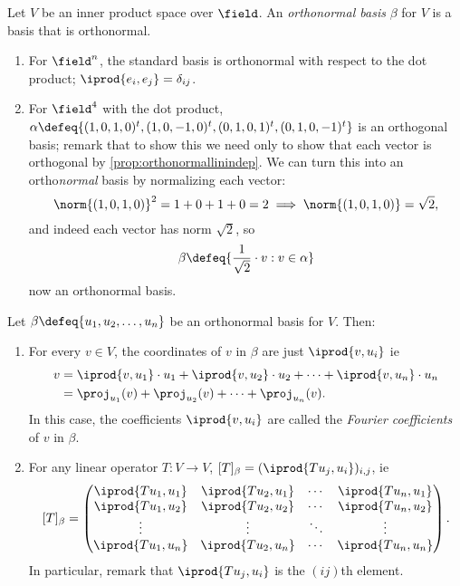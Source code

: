 \begin{definition}
    Let $V$ be an inner product space over $\field$. An \emph{orthonormal basis} $\beta$ for $V$ is a basis that is orthonormal.
\end{definition}

\begin{example}
\begin{enumerate}[label=(\alph*)]
    \item For $\field^n$, the standard basis is orthonormal with respect to the dot product; $\iprod{e_i, e_j} = \delta_{ij}$.
    \item For $\field^4$ with the dot product, $\alpha \defeq \{(1, 0, 1, 0)^t, (1, 0, -1, 0)^t, (0, 1, 0, 1)^t, (0, 1, 0, -1)^t\}$ is an orthogonal basis; remark that to show this we need only to show that each vector is orthogonal by \cref{prop:orthonormallinindep}. We can turn this into an ortho\emph{normal} basis by normalizing each vector:
    \[\norm{(1,0,1,0)}^2 = 1 + 0 + 1 + 0 = 2 \implies \norm{(1,0,1,0)} = \sqrt{2},\]
    and indeed each vector has norm $\sqrt{2}$, so \[
    \beta \defeq \{\frac{1}{\sqrt{2}} \cdot v : v \in \alpha\}    
    \]
    now an orthonormal basis.
\end{enumerate}    
\end{example}


\begin{proposition}
Let $\beta \defeq \{u_1, u_2, \dots, u_n\}$ be an orthonormal basis for $V$. Then: \begin{enumerate}[label=(\alph*)]
    \item For every $v \in V$, the coordinates of $v$ in $\beta$ are just $\iprod{v, u_i}$ ie \begin{align*}
    v &= \iprod{v, u_1}\cdot u_1  + \iprod{v, u_2}\cdot u_2 + \cdots + \iprod{v, u_n} \cdot u_n\\
        &= \proj_{u_1}(v) + \proj_{u_2}(v) + \cdots + \proj_{u_n}(v).
    \end{align*}
    In this case, the coefficients $\iprod{v, u_i}$ are called the \emph{Fourier coefficients} of $v$ in $\beta$.
    \item For any linear operator $T : V \to V$, $[T]_\beta = (\iprod{Tu_j, u_i})_{i,j}$, ie \[
    [T]_\beta = \begin{pmatrix}
        \iprod{Tu_1, u_1} & \iprod{Tu_2, u_1} &\cdots &  \iprod{Tu_n, u_1}\\
        \iprod{Tu_1, u_2} & \iprod{Tu_2, u_2} &\cdots &  \iprod{Tu_n, u_2}\\
        \vdots & \vdots & \ddots & \vdots\\
        \iprod{Tu_1, u_n} & \iprod{Tu_2, u_n} &\cdots &  \iprod{Tu_n, u_n}\\
    \end{pmatrix}.   
    \]
    In particular, remark that $\iprod{Tu_j, u_i}$ is the $(ij)$th element.
\end{enumerate}
\end{proposition}

